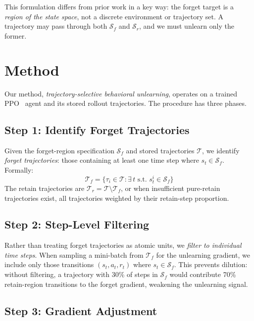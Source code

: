\documentclass[sigconf]{acmart}
\begin{document}
This formulation differs from prior work in a key way: the forget target is a \emph{region of the state space}, not a discrete environment or trajectory set. A trajectory may pass through both $\mathcal{S}_f$ and $\mathcal{S}_r$, and we must unlearn only the former.

\section{Method}

Our method, \emph{trajectory-selective behavioral unlearning}, operates on a trained PPO~\cite{schulman2017proximal} agent and its stored rollout trajectories. The procedure has three phases.

\subsection{Step 1: Identify Forget Trajectories}

Given the forget-region specification $\mathcal{S}_f$ and stored trajectories $\mathcal{T}$, we identify \emph{forget trajectories}: those containing at least one time step where $s_t \in \mathcal{S}_f$. Formally:
\begin{equation}
    \mathcal{T}_f = \{\tau_i \in \mathcal{T} : \exists\, t \text{ s.t. } s_t^i \in \mathcal{S}_f\}
\end{equation}
The retain trajectories are $\mathcal{T}_r = \mathcal{T} \setminus \mathcal{T}_f$, or when insufficient pure-retain trajectories exist, all trajectories weighted by their retain-step proportion.

\subsection{Step 2: Step-Level Filtering}

Rather than treating forget trajectories as atomic units, we \emph{filter to individual time steps}. When sampling a mini-batch from $\mathcal{T}_f$ for the unlearning gradient, we include only those transitions $(s_t, a_t, r_t)$ where $s_t \in \mathcal{S}_f$. This prevents dilution: without filtering, a trajectory with 30\% of steps in $\mathcal{S}_f$ would contribute 70\% retain-region transitions to the forget gradient, weakening the unlearning signal.

\subsection{Step 3: Gradient Adjustment}
\end{document}
